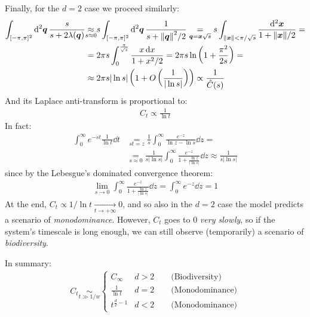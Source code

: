 \documentclass[../../main.tex]{subfiles}
\begin{document}
Finally, for the $d=2$ case we proceed similarly:
\begin{align*}
    \int_{[-\pi, \pi]^2} \dd[2]{\bm{q}} \frac{s}{s+2\lambda(\bm{q})}  &\underset{\mathclap{s\approx 0}}{\approx} s \int_{[-\pi, \pi]^2} \dd[2]{\bm{q}} \frac{1}{s+ \norm{\bm{q}}^2/2}  \underset{\bm{q}=\bm{x}\sqrt{s}}{=} s \int_{\norm{\bm{x}} < \pi/\sqrt{s}} \frac{\dd[2]{\bm{x}}}{1 + \norm{\bm{x}}/2} =\\
    &=  2 \pi s \int_0^{\frac{\pi}{\sqrt{s}}} \frac{x \dd{x}}{1 + x^2/2} = 2 \pi s \ln \left(1+\frac{\pi^2}{2 s} \right) =\\
    &\approx 2 \pi s |\ln s| \left(1+ O\left(\frac{1}{|\ln s|} \right)\right) \propto \frac{1}{\hat{C}(s)} 
\end{align*}
And its Laplace anti-transform is proportional to:
\begin{align*}
    C_t \propto \frac{1}{\ln t} 
\end{align*}
In fact:
\begin{align*}
    \int_0^\infty e^{-st} \frac{1}{\ln t}  \dd{t} &\underset{st = z}{=}  \frac{1}{s} \int_0^\infty \frac{e^{-z}}{\ln z - \ln s} \dd{z} =\\
    &\underset{s \approx 0}{=}   \frac{1}{s |\ln s|} \int_0^\infty \frac{e^{-z}}{1 + \frac{\ln z}{|\ln s|} } \dd{z} \approx \frac{1}{s |\ln s|} 
\end{align*}
since by the Lebesgue's dominated convergence theorem:
\begin{align*}
    \lim_{s \to 0} \int_0^\infty \frac{e^{-z}}{1 + \frac{\ln z}{|\ln s|} } \dd{z} = \int_0^\infty e^{-z} \dd{z} = 1
\end{align*}
At the end, $C_t \propto 1/\ln t  \xrightarrow[t \to +\infty]{}  0$, and so also in the $d=2$ case the model predicts a scenario of \textit{monodominance}. However, $C_t$ goes to $0$ \textit{very slowly}, so if the system's timescale is long enough, we can still observe (temporarily) a scenario of \textit{biodiversity}.

\medskip

In summary:
\begin{align}\label{eqn:scaling-2-point-corr}
    C_t \underset{t \gg 1/w}{\sim} \begin{cases}
        C_\infty & d > 2 \qquad \text{(Biodiversity)}\\
        \frac{1}{\ln t} & d = 2 \qquad \text{(Monodominance)} \\
        t^{\frac{d}{2} - 1} & d < 2 \qquad \text{(Monodominance)}
    \end{cases}
\end{align}
\end{document}
